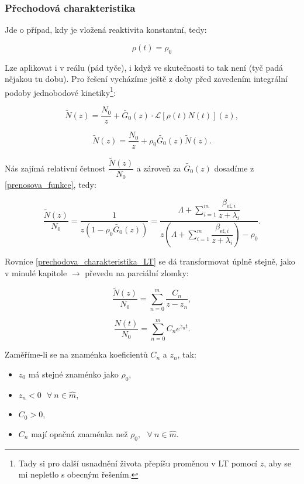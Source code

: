 \subsubsection{Přechodová charakteristika}

Jde o případ, kdy je vložená reaktivita konstantní, tedy:

$$\rho(t) = \rho_0$$

Lze aplikovat i v reálu (pád tyče), i když ve skutečnosti to tak není (tyč padá nějakou tu dobu). Pro řešení vycházíme ještě z doby před zavedením integrální podoby jednobodové kinetiky\footnote{Tady si pro další usnadnění života přepíšu proměnou v LT pomocí $z$, aby se mi nepletlo s obecným řešením.}:

$$ \tilde{N}(z) = \dfrac{N_0}{z} + \tilde{G_0}(z) \cdot \mathcal{L}[\rho(t) N(t)](z), $$

$$ \tilde{N}(z) = \dfrac{N_0}{z} + \rho_0 \tilde{G_0}(z) \tilde{N}(z).$$

Nás zajímá relativní četnost $\dfrac{\tilde{N}(z)}{N_0}$ a zároveň za $\tilde{G_0}(z)$ dosadíme z \eqref{prenosova_funkce}, tedy:

\begin{equation}
  \boxed{
  \dfrac{\tilde{N}(z)}{N_0} = \dfrac{1}{z \left ( 1-\rho_0 \tilde{G_0}(z) \right )} = \dfrac{\Lambda + \sum_{i = 1}^m \dfrac{\beta_{\text{ef},i}}{z + \lambda_i}}{z \left ( \Lambda + \sum_{i = 1}^m \dfrac{\beta_{\text{ef},i}}{z + \lambda_i} \right ) - \rho_0}.
  \label{prechodova_charakteristika_LT}}
\end{equation}

Rovnice \eqref{prechodova_charakteristika_LT} se dá transformovat úplně stejně, jako v minulé kapitole $\rightarrow$ převedu na parciální zlomky:

$$ \dfrac{\tilde{N}(z)}{N_0} = \sum_{n=0}^m \dfrac{C_n}{z-z_n}, $$

\begin{equation}
  \boxed{
  \dfrac{N(t)}{N_0} = \sum_{n=0}^m C_n e^{z_n t}.
  \label{prechodova_charakteristika}}
\end{equation}

Zaměříme-li se na znaménka koeficientů $C_n$ a $z_n$, tak:

\begin{itemize}
  \item $z_0$ má stejné znaménko jako $\rho_0$,
  \item $z_n < 0 \: \: \: \forall \: n \in \widehat{m}$,
  \item $C_0 > 0$,
  \item $C_n$ mají opačná znaménka než $\rho_0, \: \: \: \forall \: n \in \widehat{m}$.
\end{itemize}

